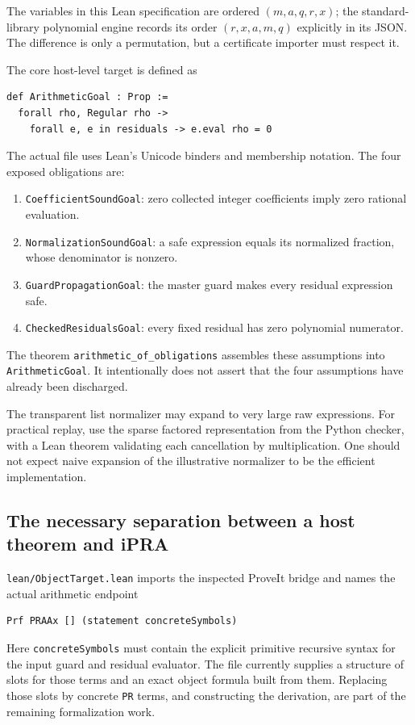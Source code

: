 \documentclass[11pt,a4paper]{article}
\numberwithin{equation}{section}
\theoremstyle{definition}\newtheorem{definition}[theorem]{Definition}
\theoremstyle{remark}\newtheorem{remark}[theorem]{Remark}
\newcommand{\file}[1]{\nolinkurl{#1}}
\begin{document}
The variables in this Lean specification are ordered $(m,a,q,r,x)$; the standard-library polynomial engine records its order $(r,x,a,m,q)$ explicitly in its JSON. The difference is only a permutation, but a certificate importer must respect it.

The core host-level target is defined as
\begin{lstlisting}
def ArithmeticGoal : Prop :=
  forall rho, Regular rho ->
    forall e, e in residuals -> e.eval rho = 0
\end{lstlisting}
The actual file uses Lean's Unicode binders and membership notation. The four exposed obligations are:
\begin{enumerate}
 \item \texttt{CoefficientSoundGoal}: zero collected integer coefficients imply zero rational evaluation.
 \item \texttt{NormalizationSoundGoal}: a safe expression equals its normalized fraction, whose denominator is nonzero.
 \item \texttt{GuardPropagationGoal}: the master guard makes every residual expression safe.
 \item \texttt{CheckedResidualsGoal}: every fixed residual has zero polynomial numerator.
\end{enumerate}
The theorem \texttt{arithmetic\_of\_obligations} assembles these assumptions into \texttt{ArithmeticGoal}. It intentionally does not assert that the four assumptions have already been discharged.

The transparent list normalizer may expand to very large raw expressions. For practical replay, use the sparse factored representation from the Python checker, with a Lean theorem validating each cancellation by multiplication. One should not expect naive expansion of the illustrative normalizer to be the efficient implementation.

\subsection{The necessary separation between a host theorem and iPRA}
\file{lean/ObjectTarget.lean} imports the inspected ProveIt bridge and names the actual arithmetic endpoint
\begin{lstlisting}
Prf PRAAx [] (statement concreteSymbols)
\end{lstlisting}
Here \texttt{concreteSymbols} must contain the explicit primitive recursive syntax for the input guard and residual evaluator. The file currently supplies a structure of slots for those terms and an exact object formula built from them. Replacing those slots by concrete \texttt{PR} terms, and constructing the derivation, are part of the remaining formalization work.
\end{document}

